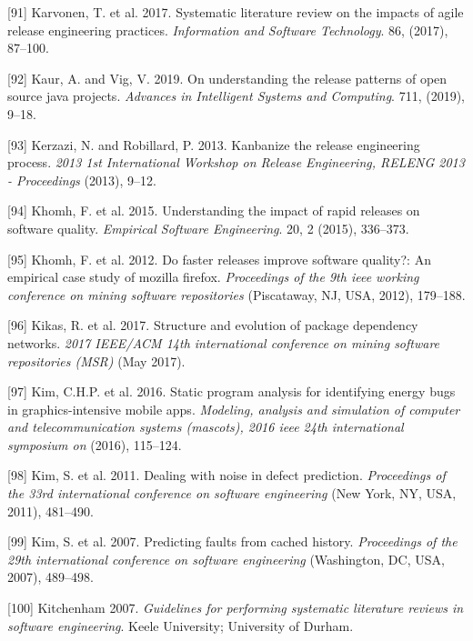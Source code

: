 \documentclass[]{book}
\begin{document}
\hypertarget{ref-karvonen2017a}{}
{[}91{]} Karvonen, T. et al. 2017. Systematic literature review on the
impacts of agile release engineering practices. \emph{Information and
Software Technology}. 86, (2017), 87--100.

\hypertarget{ref-kaur2019a}{}
{[}92{]} Kaur, A. and Vig, V. 2019. On understanding the release
patterns of open source java projects. \emph{Advances in Intelligent
Systems and Computing}. 711, (2019), 9--18.

\hypertarget{ref-kerzazi2013a}{}
{[}93{]} Kerzazi, N. and Robillard, P. 2013. Kanbanize the release
engineering process. \emph{2013 1st International Workshop on Release
Engineering, RELENG 2013 - Proceedings} (2013), 9--12.

\hypertarget{ref-khomh2015a}{}
{[}94{]} Khomh, F. et al. 2015. Understanding the impact of rapid
releases on software quality. \emph{Empirical Software Engineering}. 20,
2 (2015), 336--373.

\hypertarget{ref-khomh2012a}{}
{[}95{]} Khomh, F. et al. 2012. Do faster releases improve software
quality?: An empirical case study of mozilla firefox. \emph{Proceedings
of the 9th ieee working conference on mining software repositories}
(Piscataway, NJ, USA, 2012), 179--188.

\hypertarget{ref-Kikas2017}{}
{[}96{]} Kikas, R. et al. 2017. Structure and evolution of package
dependency networks. \emph{2017 IEEE/ACM 14th international conference
on mining software repositories (MSR)} (May 2017).

\hypertarget{ref-KKK2016}{}
{[}97{]} Kim, C.H.P. et al. 2016. Static program analysis for
identifying energy bugs in graphics-intensive mobile apps.
\emph{Modeling, analysis and simulation of computer and
telecommunication systems (mascots), 2016 ieee 24th international
symposium on} (2016), 115--124.

\hypertarget{ref-Kim2011}{}
{[}98{]} Kim, S. et al. 2011. Dealing with noise in defect prediction.
\emph{Proceedings of the 33rd international conference on software
engineering} (New York, NY, USA, 2011), 481--490.

\hypertarget{ref-kim2007}{}
{[}99{]} Kim, S. et al. 2007. Predicting faults from cached history.
\emph{Proceedings of the 29th international conference on software
engineering} (Washington, DC, USA, 2007), 489--498.

\hypertarget{ref-kitchenham2007}{}
{[}100{]} Kitchenham 2007. \emph{Guidelines for performing systematic
literature reviews in software engineering}. Keele University;
University of Durham.
\end{document}
